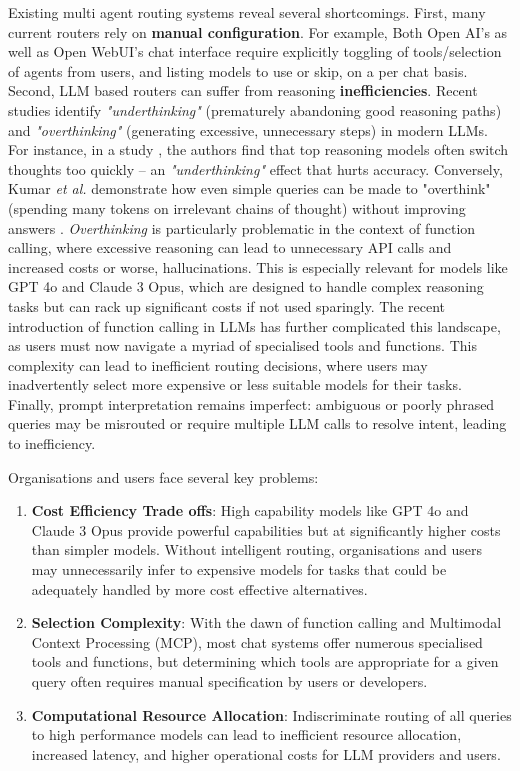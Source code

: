 Existing multi agent routing systems reveal several shortcomings. First, many current routers rely on \textbf{manual configuration}. For example, Both Open AI's as well as Open WebUI's chat interface require explicitly toggling of tools/selection of agents from users, and listing models to use or skip, on a per chat basis. Second, LLM based routers can suffer from reasoning \textbf{inefficiencies}. Recent studies identify \textit{"underthinking"} (prematurely abandoning good reasoning paths) and \textit{"overthinking"} (generating excessive, unnecessary steps) in modern LLMs. For instance, in a study \cite{wang2025thoughtsplaceunderthinkingo1like}, the authors find that top reasoning models often switch thoughts too quickly – an \textit{"underthinking"} effect that hurts accuracy. Conversely, Kumar \textit{et al.} demonstrate how even simple queries can be made to "overthink" (spending many tokens on irrelevant chains of thought) without improving answers \cite{kumar2025overthinkslowdownattacksreasoning}. \textit{Overthinking} is particularly problematic in the context of function calling, where excessive reasoning can lead to unnecessary API calls and increased costs or worse, hallucinations. This is especially relevant for models like GPT 4o and Claude 3 Opus, which are designed to handle complex reasoning tasks but can rack up significant costs if not used sparingly. The recent introduction of function calling in LLMs has further complicated this landscape, as users must now navigate a myriad of specialised tools and functions. This complexity can lead to inefficient routing decisions, where users may inadvertently select more expensive or less suitable models for their tasks. Finally, prompt interpretation remains imperfect: ambiguous or poorly phrased queries may be misrouted or require multiple LLM calls to resolve intent, leading to inefficiency.

Organisations and users face several key problems:
\begin{enumerate}
    \item \textbf{Cost Efficiency Trade offs}: High capability models like GPT 4o and Claude 3 Opus provide powerful capabilities but at significantly higher costs than simpler models. Without intelligent routing, organisations and users may unnecessarily infer to expensive models for tasks that could be adequately handled by more cost effective alternatives.
    
    \item \textbf{Selection Complexity}: With the dawn of function calling and Multimodal Context Processing (MCP), most chat systems offer numerous specialised tools and functions, but determining which tools are appropriate for a given query often requires manual specification by users or developers.
    
    \item \textbf{Computational Resource Allocation}: Indiscriminate routing of all queries to high performance models can lead to inefficient resource allocation, increased latency, and higher operational costs for LLM providers and users.
\end{enumerate}

